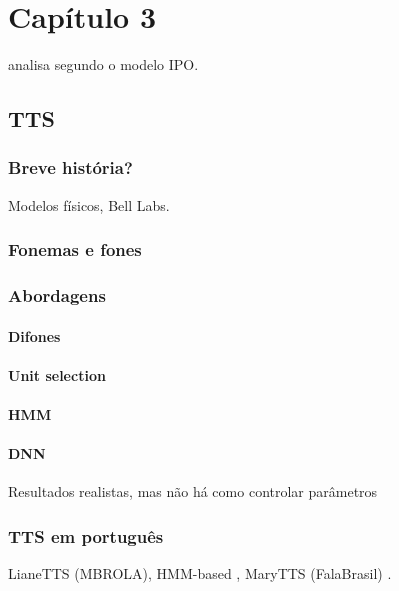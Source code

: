 
\chapter{Capítulo 3}

\cite{ipo} analisa segundo o modelo IPO.


\section{TTS}
\subsection{Breve história?}
Modelos físicos, Bell Labs.
\subsection{Fonemas e fones}
\subsection{Abordagens}
\subsubsection{Difones}
\subsubsection{Unit selection}
\subsubsection{HMM}
\subsubsection{DNN}
Resultados realistas, mas não há como controlar parâmetros
\subsection{TTS em português}
LianeTTS (MBROLA), HMM-based \cite{couto}, MaryTTS (FalaBrasil) \cite{falabrasil}.
